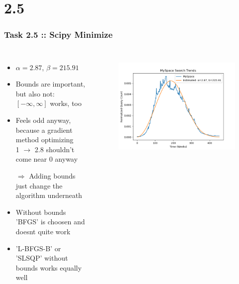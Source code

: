 \documentclass[10pt,aspectratio=169,handout]{beamer}
\begin{document}
\section{2.5}
\begin{frame}
    \frametitle{Task 2.5 :: Scipy Minimize}
    \inputminted[bgcolor=LightGray,fontsize=\small]{python}{code/minimize-kl.py}

    \begin{columns}
    \begin{column}{0.7\textwidth}
        \begin{itemize}
            \item $\alpha=2.87$, $\beta=215.91$
            \item Bounds are important, but also not: $[-\infty, \infty]$ works, too
            \item Feels odd anyway, because a gradient method optimizing \\ 
                    1 $\rightarrow$ 2.8 shouldn't come near 0 anyway
            \item[$\Rightarrow$] Adding bounds just change the algorithm underneath
            \item Without bounds 'BFGS' is choosen and doesnt quite work
            \item 'L-BFGS-B' or 'SLSQP' without bounds works equally well
        \end{itemize}
    \end{column}

    \begin{column}{0.3\textwidth}
        \begin{figure}
            \includegraphics[width=\textwidth]{images/sciminimize.png}
        \end{figure}
    \end{column}
    \end{columns}

\end{frame}
\end{document}
